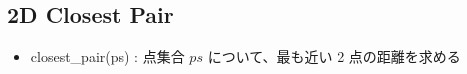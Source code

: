 \subsection{2D Closest Pair}

\begin{itemize}
    \item closest\_pair(ps) : 点集合 $ps$ について、最も近い 2 点の距離を求める
\end{itemize}


